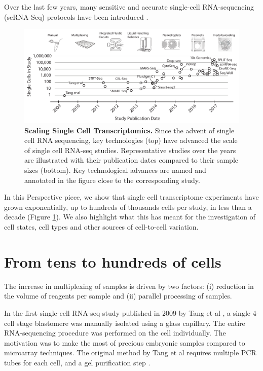 Over the last few years, many sensitive and accurate single-cell RNA-sequencing
(scRNA-Seq) protocols have been introduced \cite{Svensson2017-pf}.

\begin{figure}
    \centering
    \centerline{\includegraphics[width=\textwidth]{"main-figure"}}
    \caption[Scaling Single Cell Transcriptomics]{\textbf{Scaling Single Cell Transcriptomics.} Since the advent of single cell RNA sequencing, key technologies (top) have advanced the scale of single cell RNA-seq studies. Representative studies over the years are illustrated with their publication dates compared to their sample sizes (bottom). Key technological advances are named and annotated in the figure close to the corresponding study.}
    \label{fig:scaling}
\end{figure}

In this Perspective piece, we show that single cell transcriptome experiments have grown exponentially, up to hundreds of thousands cells per study, in less than a decade (Figure \ref{fig:scaling}). We also highlight what this has meant for the investigation of cell states, cell types and other sources of cell-to-cell variation.

\section{From tens to hundreds of cells}

The increase in multiplexing of samples is driven by two factors: (i) reduction in the volume
of reagents per sample and (ii) parallel processing of samples.

In the first single-cell RNA-seq study published in 2009 by Tang et al \cite{Tang2009-af}, a single 4-cell stage
blastomere was manually isolated using a glass capillary. The entire RNA-sequencing
procedure was performed on the cell individually. The motivation was to make the most of
precious embryonic samples compared to microarray techniques. The original method by
Tang et al requires multiple PCR tubes for each cell, and a gel purification step \cite{Sasagawa2013-ps, Tang2010-am}.

